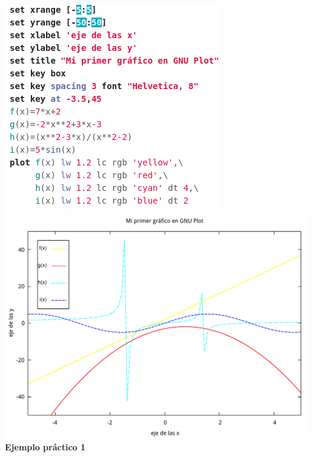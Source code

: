 \documentclass[11.5pt,a4paper]{article}
\begin{document}
\includegraphics[scale=0.50]{screen2.png}  
\includegraphics[scale=0.40]{ejemplo3.pdf}\\ 

\newpage
\textbf{Ejemplo práctico 1}\\
\end{document}

